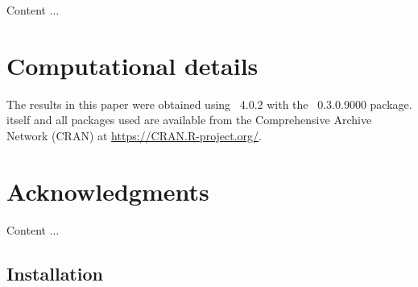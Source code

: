 \documentclass[article]{jss}
\begin{document}
Content ...


\section*{Computational details}

The results in this paper were obtained using
~4.0.2 with the
~0.3.0.9000 package.  itself
and all packages used are available from the Comprehensive
 Archive Network (CRAN) at \url{https://CRAN.R-project.org/}.


\section*{Acknowledgments}
Content ...






\newpage

\begin{appendix}

\section{Installation} \label{app:installation}

\end{appendix}

\end{document}
